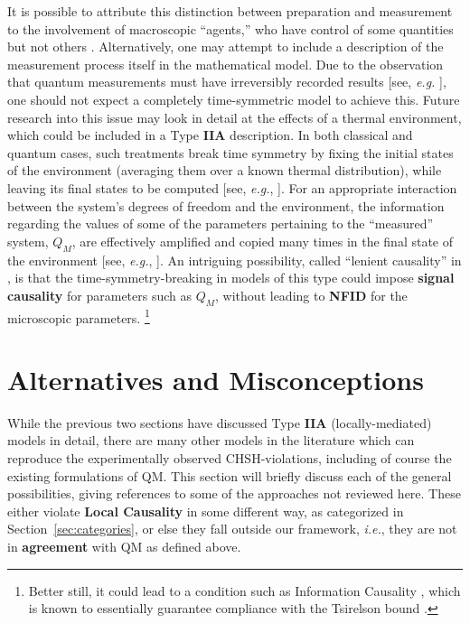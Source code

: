 \documentclass[onecolumn, nofootinbib, 12pt]{revtex4-1}
\begin{document}
It is possible to attribute this distinction between preparation and measurement to the involvement of macroscopic ``agents,'' who have control of some quantities but not others \cite{price1997}.  Alternatively, one may attempt to include a description of the measurement process itself in the mathematical model.  Due to the observation that quantum measurements must have irreversibly recorded results [see, \emph{e.g.} \textcite{miller1996}], one should not expect a completely time-symmetric model to achieve this.  Future research into this issue may look in detail at the effects of a thermal environment, which could be included in a Type {\bf IIA} description.  In both classical and quantum cases, such treatments break time symmetry by fixing the initial states of the environment (averaging them over a known thermal distribution), while leaving its final states to be computed [see, \emph{e.g.}, \textcite{feynman1963}].  For an appropriate interaction between the system's degrees of freedom and the environment, the information regarding the values of some of the parameters pertaining to the ``measured'' system, $Q_M$, are effectively amplified and copied many times in the final state of the environment [see, \emph{e.g.}, \textcite{zurek2003}].  An intriguing possibility, called ``lenient causality'' in \textcite{argaman2018}, is that the time-symmetry-breaking in models of this type could impose {\bf signal causality} for parameters such as $Q_M$, without leading to {\bf NFID} for the microscopic parameters.%
\footnote{Better still, it could lead to a condition such as Information Causality \cite{pawlowski2009}, which is known to essentially guarantee compliance with the Tsirelson bound \cite{cirelson1980}.}

\section{Alternatives and Misconceptions}
\label{sec:alternatives}

While the previous two sections have discussed Type {\bf IIA} (locally-mediated) models in detail, there are many other models in the literature which can reproduce the experimentally observed CHSH-violations, including of course the existing formulations of QM\@.  This section will briefly discuss each of the general possibilities, giving references to some of the approaches not reviewed here.  These either violate {\bf Local Causality} in some different way, as categorized in Section~\ref{sec:categories}, or else they fall outside our framework, \emph{i.e.}, they are not in {\bf agreement} with QM as defined above.
\end{document}
